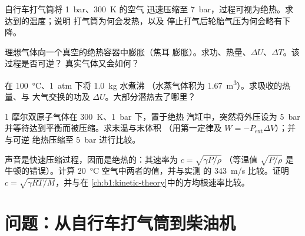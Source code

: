 \begin{exercise}[$\star\star$]\label{exo:b1:first-law:8}
自行车打气筒将 \qty{1}{bar}、\qty{300}{K} 的空气
迅速压缩至 \qty{7}{bar}，过程可视为绝热。求达到的温度；说明
打气筒为何会发热，以及
停止打气后轮胎气压为何会略有下降。
\end{exercise}

\begin{exercise}[$\star\star$]\label{exo:b1:first-law:9}
理想气体向一个真空的绝热容器中膨胀（焦耳
膨胀）。求功、热量、$\Delta U$、$\Delta T$。该过程是否可逆？
真实气体又会如何？
\end{exercise}

\begin{exercise}[$\star\star\star$]\label{exo:b1:first-law:10}
在 \qty{100}{\degreeCelsius}、\qty{1}{atm} 下将 \qty{1.0}{kg} 水煮沸
（水蒸气体积为 \qty{1.67}{m^3}）。求吸收的热量、与
大气交换的功及 $\Delta U$。大部分潜热去了哪里？
\end{exercise}

\begin{exercise}[$\star\star\star$]\label{exo:b1:first-law:11}
1 摩尔双原子气体在 \qty{300}{K}、\qty{1}{bar} 下，置于绝热
汽缸中，突然将外压设为
\qty{5}{bar} 并等待达到平衡而被压缩。求末温与末体积
（用第一定律及 $W = -P_{\mathrm{ext}}\Delta V$）；并与可逆
绝热压缩至 \qty{5}{bar} 进行比较。
\end{exercise}

\begin{exercise}[$\star\star\star$]\label{exo:b1:first-law:12}
声音是快速压缩过程，因而是绝热的：其速率为 $c = \sqrt{\gamma P/\rho}$
（等温值 $\sqrt{P/\rho}$ 是牛顿的错误）。计算
\qty{20}{\degreeCelsius} 空气中两者的值，并与实测
的 \qty{343}{m/s} 比较。证明 $c = \sqrt{\gamma RT/M}$，并与在
\cref{ch:b1:kinetic-theory}中的方均根速率比较。
\end{exercise}

\section{问题：从自行车打气筒到柴油机}

